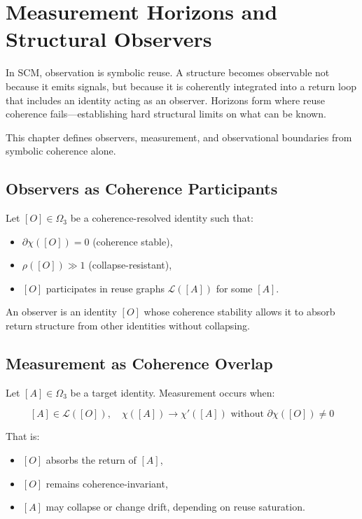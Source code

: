 \chapter{Measurement Horizons and Structural Observers} \label{chapter-measurement-observers}

In SCM, observation is symbolic reuse. A structure becomes observable not because it emits signals, but because it is coherently integrated into a return loop that includes an identity acting as an observer. Horizons form where reuse coherence fails—establishing hard structural limits on what can be known.

This chapter defines observers, measurement, and observational boundaries from symbolic coherence alone.

\section{Observers as Coherence Participants} \label{sec:observers-defined}

Let $[O] \in \Omega_3$ be a coherence-resolved identity such that:

\begin{itemize}
  \item $\partial\chi([O]) = 0$ (coherence stable),
  \item $\rho([O]) \gg 1$ (collapse-resistant),
  \item $[O]$ participates in reuse graphs $\mathcal{L}([A])$ for some $[A]$.
\end{itemize}

\begin{definition}
An observer is an identity $[O]$ whose coherence stability allows it to absorb return structure from other identities without collapsing.
\end{definition}

\section{Measurement as Coherence Overlap} \label{sec:measurement-coherence}

Let $[A] \in \Omega_3$ be a target identity. Measurement occurs when:

\[
[A] \in \mathcal{L}([O]),\quad \chi([A]) \to \chi'([A]) \text{ without } \partial\chi([O]) \ne 0
\]

That is:
\begin{itemize}
  \item $[O]$ absorbs the return of $[A]$,
  \item $[O]$ remains coherence-invariant,
  \item $[A]$ may collapse or change drift, depending on reuse saturation.
\end{itemize}

